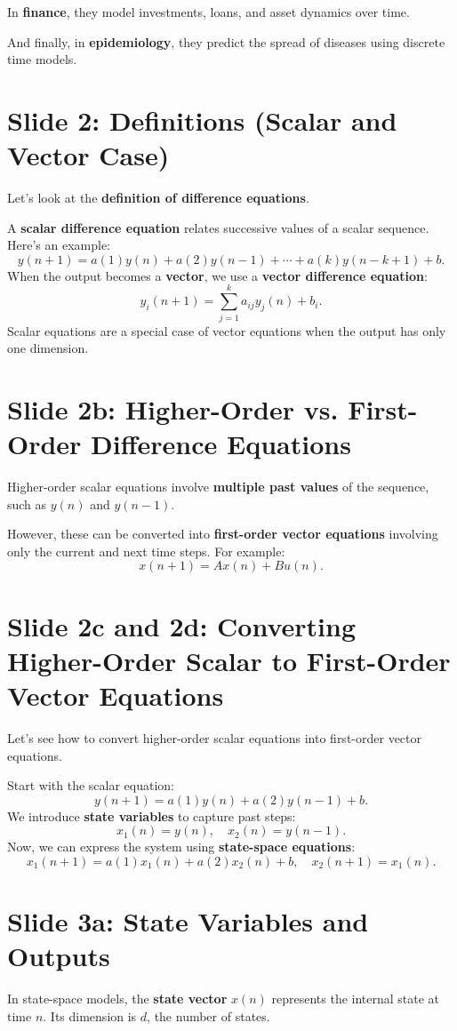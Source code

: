 \documentclass[12pt]{article}
\begin{document}
In \textbf{finance}, they model investments, loans, and asset dynamics over time.

And finally, in \textbf{epidemiology}, they predict the spread of diseases using discrete time models.

\section*{Slide 2: Definitions (Scalar and Vector Case)}
Let’s look at the \textbf{definition of difference equations}.

A \textbf{scalar difference equation} relates successive values of a scalar sequence. Here’s an example:
\[
y(n+1) = a(1) y(n) + a(2) y(n-1) + \cdots + a(k) y(n-k+1) + b.
\]
When the output becomes a \textbf{vector}, we use a \textbf{vector difference equation}:
\[
y_i(n+1) = \sum_{j=1}^{k} a_{ij} y_j(n) + b_i.
\]
Scalar equations are a special case of vector equations when the output has only one dimension.

\section*{Slide 2b: Higher-Order vs. First-Order Difference Equations}
Higher-order scalar equations involve \textbf{multiple past values} of the sequence, such as \( y(n) \) and \( y(n-1) \).

However, these can be converted into \textbf{first-order vector equations} involving only the current and next time steps. For example:
\[
x(n+1) = A x(n) + B u(n).
\]

\section*{Slide 2c and 2d: Converting Higher-Order Scalar to First-Order Vector Equations}
Let’s see how to convert higher-order scalar equations into first-order vector equations.

Start with the scalar equation:
\[
y(n+1) = a(1) y(n) + a(2) y(n-1) + b.
\]
We introduce \textbf{state variables} to capture past steps:
\[
x_1(n) = y(n), \quad x_2(n) = y(n-1).
\]
Now, we can express the system using \textbf{state-space equations}:
\[
x_1(n+1) = a(1) x_1(n) + a(2) x_2(n) + b, \quad x_2(n+1) = x_1(n).
\]

\section*{Slide 3a: State Variables and Outputs}
In state-space models, the \textbf{state vector} \( x(n) \) represents the internal state at time \( n \). Its dimension is \( d \), the number of states.
\end{document}

